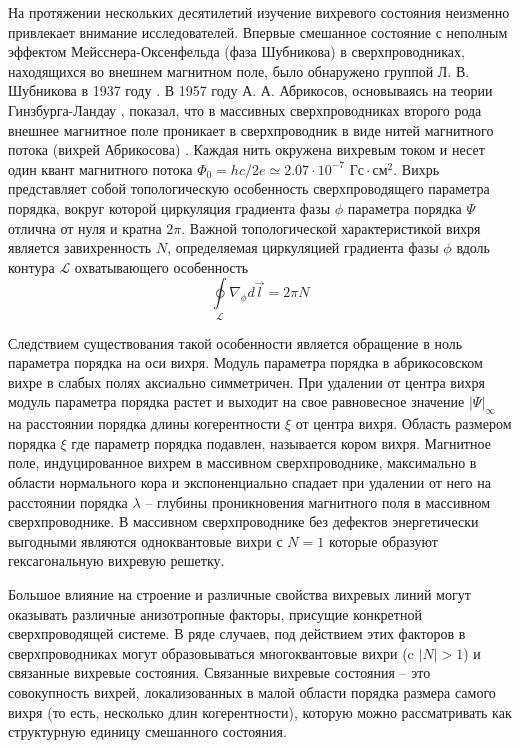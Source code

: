 На протяжении нескольких десятилетий изучение вихревого состояния неизменно 
привлекает внимание исследователей. Впервые смешанное состояние с неполным 
эффектом Мейсснера-Оксенфельда (фаза Шубникова) в сверхпроводниках, 
находящихся во внешнем магнитном поле, было обнаружено группой Л. В. 
Шубникова в 1937 году \cite{shubnikov}. В 1957 году А. А. Абрикосов, 
основываясь на теории Гинзбурга-Ландау \cite{ginzburg-landau}, показал, что в 
массивных сверхпроводниках второго рода внешнее магнитное поле проникает в 
сверхпроводник в виде нитей магнитного потока (вихрей Абрикосова)
\cite{abrikosov}. Каждая нить окружена вихревым током и несет один квант 
магнитного потока 
\( \Phi_0 = hc/2e \simeq 2.07\cdot10^{-7} \text{ Гс}\cdot\text{см}^2 \). Вихрь 
представляет собой топологическую особенность сверхпроводящего параметра 
порядка, вокруг которой циркуляция градиента фазы \( \phi \) параметра порядка 
\( \Psi \) отлична от нуля и кратна \( 2\pi \). Важной топологической 
характеристикой вихря является завихренность \( N \), определяемая циркуляцией 
градиента фазы \( \phi \) вдоль контура \( \mathcal{L} \) охватывающего 
особенность 
\begin{equation}
    \oint\limits_{\mathcal{L}} \nabla_\phi d\vec{l} = 2\pi N
\end{equation}

Следствием существования такой особенности является обращение в ноль параметра 
порядка на оси вихря. Модуль параметра порядка в абрикосовском вихре в слабых 
полях аксиально симметричен. При удалении от центра вихря модуль параметра 
порядка растет и выходит на свое равновесное значение \( |\Psi|_\infty \) на 
расстоянии порядка длины когерентности \( \xi \) от центра вихря. Область 
размером порядка \( \xi \) где параметр порядка подавлен, называется кором 
вихря. Магнитное поле, индуцированное вихрем в массивном сверхпроводнике, 
максимально в области нормального кора и экспоненциально спадает при удалении 
от него на расстоянии порядка \( \lambda \) -- глубины проникновения магнитного 
поля в массивном сверхпроводнике. В массивном сверхпроводнике без дефектов 
энергетически выгодными являются одноквантовые вихри с \( N = 1 \) которые 
образуют гексагональную вихревую решетку.

Большое влияние на строение и различные свойства вихревых линий могут 
оказывать различные анизотропные факторы, присущие конкретной сверхпроводящей 
системе. В ряде случаев, под действием этих факторов в сверхпроводниках могут 
образовываться многоквантовые вихри (c \( |N| > 1 \)) и связанные вихревые
состояния. Связанные вихревые состояния -- это совокупность вихрей, 
локализованных в малой области порядка размера самого вихря (то есть, 
несколько длин когерентности), которую можно рассматривать как структурную 
единицу смешанного состояния.

